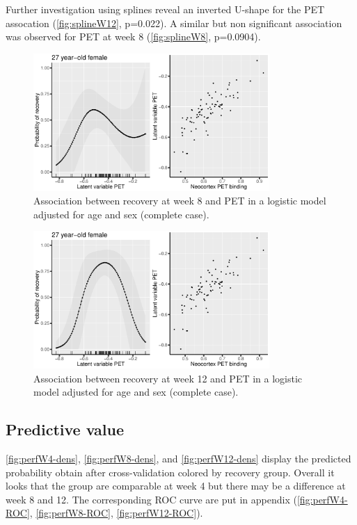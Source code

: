 \documentclass[12pt]{article}
\begin{document}
\clearpage

Further investigation using splines reveal an inverted U-shape for the
PET assocation (\autoref{fig:splineW12}, p=0.022). A similar but non
significant association was observed for PET at week 8 (\autoref{fig:splineW8},
p=0.0904).
\vfill

\begin{figure}[!h]
\centering
\includegraphics[trim={0 0 0 0},width=0.8\textwidth]{./../figures/gg-spline-w8.pdf}
\caption{\label{fig:splineW8}Association between recovery at week 8 and PET in a logistic model adjusted for age and sex (complete case).}
\end{figure}

\begin{figure}[!h]
\centering
\includegraphics[trim={0 0 0 0},width=0.8\textwidth]{./../figures/gg-spline-w12.pdf}
\caption{\label{fig:splineW12}Association between recovery at week 12 and PET in a logistic model adjusted for age and sex (complete case).}
\end{figure}

\clearpage
\subsection{Predictive value}
\label{sec:org6e03bf3}

\autoref{fig:perfW4-dens}, \autoref{fig:perfW8-dens}, and
\autoref{fig:perfW12-dens} display the predicted probability obtain
after cross-validation colored by recovery group. Overall it looks
that the group are comparable at week 4 but there may be a difference
at week 8 and 12. The corresponding ROC curve are put in appendix
(\autoref{fig:perfW4-ROC}, \autoref{fig:perfW8-ROC},
\autoref{fig:perfW12-ROC}).
\end{document}
